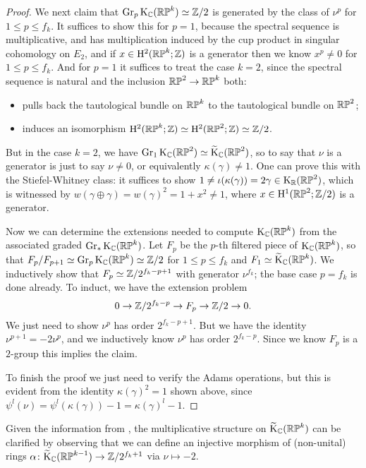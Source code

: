 \begin{proof}
  We next claim that $\operatorname{Gr}_p\mathrm{K}_{\mathbb{C}}(\mathbb{RP}^k) \simeq \mathbb{Z}/2$ is generated by
  the class of $\nu^p$ for $1 \le p \le f_k$. It suffices to show this
  for $p=1$, because the spectral sequence is multiplicative, and has
  multiplication induced by the cup product in singular cohomology on
  $E_2$, and if $x \in \mathrm{H}^2(\mathbb{RP}^k;\mathbb{Z})$ is a generator then we know
  $x^p \ne 0$ for $1 \le p \le f_k$. And for $p=1$ it suffices to
  treat the case $k=2$, since the spectral sequence is natural and the
  inclusion $\mathbb{RP}^2 \to \mathbb{RP}^k$ both:
  \begin{itemize}
  \item pulls back the tautological bundle on $\mathbb{RP}^k$ to the
    tautological bundle on $\mathbb{RP}^2$;
  \item induces an isomorphism $\mathrm{H}^2(\mathbb{RP}^k;\mathbb{Z}) \simeq \mathrm{H}^2(\mathbb{RP}^2;\mathbb{Z})
    \simeq \mathbb{Z}/2$.
  \end{itemize}
  But in the case $k=2$, we have $ \operatorname{Gr}_1\mathrm{K}_{\mathbb{C}}(\mathbb{RP}^2) \simeq
  \widetilde{\mathrm{K}}_{\mathbb{C}}(\mathbb{RP}^2)$, so to say that $\nu$ is a generator is just to say
  $\nu \ne 0$, or equivalently $\kappa(\gamma) \ne 1$. One can prove
  this with the Stiefel-Whitney class: it suffices to show $1 \ne
  \iota(\kappa(\gamma)) = 2\gamma \in \mathrm{K}_{\mathbb{R}}(\mathbb{RP}^2)$, which is
  witnessed by $w(\gamma\oplus\gamma) = w(\gamma)^2 = 1+x^2 \ne 1$,
  where $x \in \mathrm{H}^1(\mathbb{RP}^2;\mathbb{Z}/2)$ is a generator.

  Now we can determine the extensions needed to compute $\mathrm{K}_{\mathbb{C}}(\mathbb{RP}^k)$
  from the associated graded $\operatorname{Gr}_*\mathrm{K}_{\mathbb{C}}(\mathbb{RP}^k)$. Let $F_p$ be the
  $p$-th filtered piece of $\mathrm{K}_{\mathbb{C}}(\mathbb{RP}^k)$, so that $F_p/F_{p+1} \simeq
  \operatorname{Gr}_p\mathrm{K}_{\mathbb{C}}(\mathbb{RP}^k) \simeq \mathbb{Z}/2$ for $1 \le p \le f_k$ and $F_1 \simeq
  \widetilde{\mathrm{K}}_{\mathbb{C}}(\mathbb{RP}^k)$. We inductively show that $F_p \simeq
  \mathbb{Z}/2^{f_k-p+1}$ with generator $\nu^{f_k}$; the base case $p=f_k$ is
  done already. To induct, we have the extension problem
  \[
  0 \to \mathbb{Z}/2^{f_k-p} \to F_p \to \mathbb{Z}/2 \to 0.
  \]
  We just need to show $\nu^p$ has order $2^{f_k-p+1}$. But we have
  the identity $\nu^{p+1} = -2\nu^p$, and we inductively know $\nu^p$
  has order $2^{f_k-p}$. Since we know $F_p$ is a $2$-group this
  implies the claim.

  To finish the proof we just need to verify the Adams operations, but
  this is evident from the identity $\kappa(\gamma)^2 = 1$ shown
  above, since $\psi^l(\nu) = \psi^l(\kappa(\gamma)) - 1 =
  \kappa(\gamma)^l - 1$.
\end{proof}

\begin{remark}
  \label{RP-ringhom}
  Given the information from , the multiplicative
  structure on $\widetilde{\mathrm{K}}_{\mathbb{C}}(\mathbb{RP}^k)$ can be clarified by observing that we
  can define an injective morphism of (non-unital) rings $\alpha \colon
  \widetilde{\mathrm{K}}_{\mathbb{C}}(\mathbb{RP}^{k-1}) \to \mathbb{Z}/2^{f_k+1}$ via $\nu \mapsto -2$.
\end{remark}

